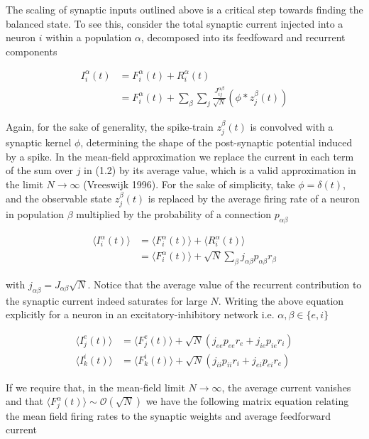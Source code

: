 \documentclass{ucetd}
\begin{document}
The scaling of synaptic inputs outlined above is a critical step towards finding the balanced state. To see this, consider the total synaptic current injected into a neuron $i$ within a population $\alpha$, decomposed into its feedfoward and recurrent components

\begin{align}
I_{i}^{\alpha}(t) &= F_{i}^{\alpha}(t) + R_{i}^{\alpha}(t)\\
&= F_{i}^{\alpha}(t) + \sum_{\beta}\sum_{j} \frac{J_{ij}^{\alpha\beta}}{\sqrt{N}}(\phi * z^{\beta}_{j}(t))
\end{align}

Again, for the sake of generality, the spike-train $z^{\beta}_{j}(t)$ is convolved with a synaptic kernel $\phi$, determining the shape of the post-synaptic potential induced by a spike. In the mean-field approximation we replace the current in each term of the sum over $j$ in (1.2) by its average value, which is a valid approximation in the limit $N\rightarrow\infty$ (Vreeswijk 1996). For the sake of simplicity, take $\phi = \delta(t)$, and the observable state $z^{\beta}_{j}(t)$ is replaced by the average firing rate of a neuron in population $\beta$ multiplied by the probability of a connection $p_{\alpha\beta}$

\begin{align*}
\langle I_{i}^{\alpha}(t)\rangle &= \langle F_{i}^{\alpha}(t)\rangle + \langle R_{i}^{\alpha}(t)\rangle\\
&= \langle F_{i}^{\alpha}(t)\rangle + \sqrt{N}\sum_{\beta}j_{\alpha\beta}p_{\alpha\beta}r_{\beta}
\end{align*}

with $j_{\alpha\beta} = J_{\alpha\beta}\sqrt{N}$. Notice that the average value of the recurrent contribution to the synaptic current indeed saturates for large $N$. Writing the above equation explicitly for a neuron in an excitatory-inhibitory network i.e. $\alpha, \beta \in \{e, i\}$

\begin{align}
\langle I_{j}^{e}(t)\rangle &= \langle F_{j}^{e}(t)\rangle + \sqrt{N}\left(j_{ee}p_{ee}r_{e} + j_{ie}p_{ie}r_{i}\right)\\
\langle I_{k}^{i}(t)\rangle &= \langle F_{k}^{i}(t)\rangle + \sqrt{N}\left(j_{ii}p_{ii}r_{i} + j_{ei}p_{ei}r_{e}\right)
\end{align}

If we require that, in the mean-field limit $N\rightarrow\infty$, the average current vanishes and that $\langle F_{j}^{\alpha}(t)\rangle \sim \mathcal{O}(\sqrt{N})$ we have the following matrix equation relating the mean field firing rates to the synaptic weights and average feedforward current
\end{document}
